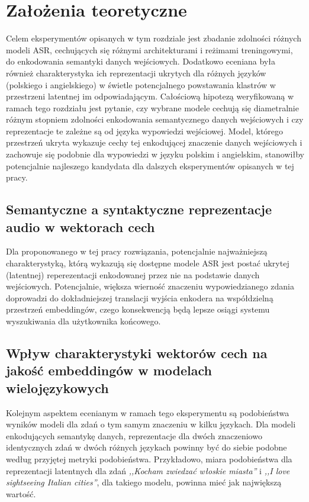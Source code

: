 \section{Założenia teoretyczne}

Celem eksperymentów opisanych w tym rozdziale jest zbadanie zdolności różnych modeli ASR, cechujących się różnymi architekturami i reżimami treningowymi, do enkodowania semantyki danych wejściowych. Dodatkowo eceniana była również charakterystyka ich reprezentacji ukrytych dla różnych języków (polskiego i angielskiego) w świetle potencjalnego powstawania klastrów w przestrzeni latentnej im odpowiadającym. Całościową hipotezą weryfikowaną w ramach tego rozdziału jest pytanie, czy wybrane modele cechują się diametralnie różnym stopniem zdolności enkodowania semantycznego danych wejściowych i czy reprezentacje te zależne są od języka wypowiedzi wejściowej. Model, którego przestrzeń ukryta wykazuje cechy tej enkodującej znaczenie danych wejściowych i zachowuje się podobnie dla wypowiedzi w języku polskim i angielskim, stanowiłby potencjalnie najleszego kandydata dla dalszych eksperymentów opisanych w tej pracy.

\subsection{Semantyczne a syntaktyczne reprezentacje audio w wektorach cech}
Dla proponowanego w tej pracy rozwiązania, potencjalnie najważniejszą charakterystyką, którą wykazują się dostępne modele ASR jest postać ukrytej (latentnej) reperezentacji enkodowanej przez nie na podstawie danych wejściowych. Potencjalnie, większa wierność znaczeniu wypowiedzianego zdania doprowadzi do dokładniejszej translacji wyjścia enkodera na współdzielną przestrzeń embeddingów, czego konsekwencją będą lepsze osiągi systemu wyszukiwania dla użytkownika końcowego.
\subsection{Wpływ charakterystyki wektorów cech na jakość embeddingów w modelach wielojęzykowych}
Kolejnym aspektem ecenianym w ramach tego eksperymentu są podobieństwa wyników modeli dla zdań o tym samym znaczeniu w kilku językach. Dla modeli enkodujących semantykę danych, reprezentacje dla dwóch znaczeniowo identycznych zdań w dwóch różnych językach powinny być do siebie podobne według przyjętej metryki podobieństwa. Przykładowo, miara podobieństwa dla reprezentacji latentnych dla zdań \textit{,,Kocham zwiedzać włoskie miasta''} i \textit{,,I love sightseeing Italian cities''}, dla takiego modelu, powinna mieć jak największą wartość.

